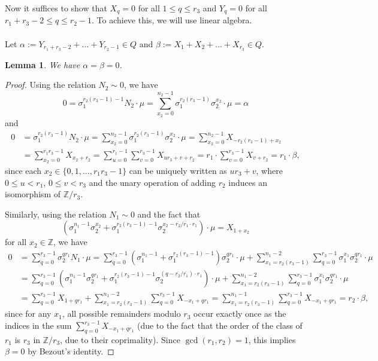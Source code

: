 \documentclass[12pt,a4paper]{article}
\newtheorem{lemma}[theorem]{Lemma}
\theoremstyle{definition}
\newcommand{\Z}{\mathbb{Z}}
\newcommand{\uo}{\overline{r_2}}
\newcommand{\vo}{\overline{r_1}}
\begin{document}


Now it suffices to show that $X_q=0$ for all $1\leq q\leq r_3$ and $Y_q=0$ for all $r_1+r_3-2\leq q\leq r_2-1$. To achieve this, we will use linear algebra.
\paragraph*{}
Let $\alpha:= Y_{r_1+r_3-2}+\dots+Y_{r_2-1}\in Q$ and $\beta:=X_1+X_2+\dots+X_{r_3}\in Q$.
\begin{lemma}
We have $\alpha=\beta=0$.
\end{lemma}
\begin{proof}
Using the relation $N_2\sim 0$, we have $$0=\sigma_1^{r_2(r_3-1)-1}N_2\cdot \mu =\sum_{x_2=0}^{n_2-1}  \sigma_1^{r_2(r_3-1)}\sigma_2^{x_2}\cdot \mu= \alpha$$ and
\begin{align*}
0&= \sigma_1^{r_2(r_3-1)}N_2\cdot \mu=\sum_{x_2=0}^{n_2-1}  \sigma_1^{r_2(r_3-1)}\sigma_2^{x_2}\cdot \mu=\sum_{x_2=0}^{n_2-1}  X_{-r_2(r_3-1)+x_2}\\
&=\sum_{x_2=0}^{r_1r_3-1}  X_{x_2+r_2}=
\sum_{u=0}^{r_1-1}\sum_{v=0}^{r_3-1} X_{ur_3+v+r_2}=r_1\cdot \sum_{v=0}^{r_3-1} X_{v+r_2}=r_1\cdot \beta,
\end{align*}
since each $x_2\in\{0,1,\dots,r_1r_3-1\}$ can be uniquely written as $ur_3+v$, where $0\leq u<r_1$, $0\leq v<r_3$ and the unary operation of adding $r_2$ induces an isomorphism of $\Z/r_3$.

Similarly, using the relation $N_1\sim 0$ and the fact that $$(\sigma_1^{n_1-1}\sigma_2^{x_2}+\sigma_1^{r_2(r_3-1)-1}\sigma_2^{x_2-\uo/\vo\cdot r_1})\cdot \mu=X_{1+x_2}$$ for all $x_2\in\Z$, we have 
\begin{align*}
0&= \sum_{q=0}^{r_3-1} \sigma_2^{qr_1}N_1\cdot \mu =\sum_{q=0}^{r_3-1}\left(\sigma_1^{n_1-1}+\sigma_1^{r_2(r_3-1)-1}\right) \sigma_2^{qr_1}\cdot \mu   
+\sum_{x_1=r_2(r_3-1)}^{n_1-2}\sum_{q=0}^{r_3-1} \sigma_1^{x_1}\sigma_2^{qr_1}\cdot \mu\\
&=\sum_{q=0}^{r_3-1}(\sigma_1^{n_1-1}\sigma_2^{qr_1}+\sigma_1^{r_2(r_3-1)-1}\sigma_2^{(q-\uo/\vo)\cdot r_1})\cdot \mu
+\sum_{x_1=r_2(r_3-1)}^{n_1-2}\sum_{q=0}^{r_3-1} \sigma_1^{x_1}\sigma_2^{qr_1}\cdot \mu\\
&=\sum_{q=0}^{r_3-1}X_{1+qr_1}+\sum_{x_1=r_2(r_3-1)}^{n_1-2}\sum_{q=0}^{r_3-1}X_{-x_1+qr_1}
= \sum_{x_1=r_2(r_3-1)}^{n_1-1}\sum_{q=0}^{r_3-1}X_{-x_1+qr_1}
=r_2\cdot \beta,
\end{align*}
since for any $x_1$, all possible remainders modulo $r_3$ occur exactly once as the indices in the sum $\sum_{q=0}^{r_3-1}X_{-x_1+qr_1}$ (due to the fact that the order of the class of $r_1$ is $r_3$ in $\Z/r_3$, due to their coprimality).
Since $\gcd(r_1,r_2)=1$, this implies $\beta=0$ by Bezout's identity.
\end{proof}
\end{document}
